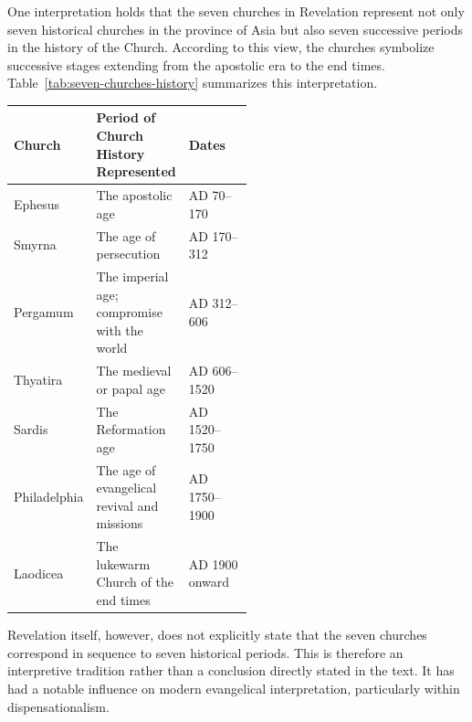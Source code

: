 \begin{InDepth}
One interpretation holds that the seven churches in Revelation represent not only seven historical churches in the province of Asia but also seven successive periods in the history of the Church. According to this view, the churches symbolize successive stages extending from the apostolic era to the end times. Table~\ref{tab:seven-churches-history} summarizes this interpretation.

\par\medskip\noindent
\begin{minipage}{\linewidth}
\centering\small
\renewcommand{\arraystretch}{1}\setlength{\tabcolsep}{4pt}
\label{tab:seven-churches-history}
\begin{tabularx}{\linewidth}{>{\raggedright\arraybackslash}p{0.25\linewidth}|
                              >{\raggedright\arraybackslash}X|
                              >{\raggedright\arraybackslash}p{0.27\linewidth}}
\hline
\textbf{Church} & \textbf{Period of Church History Represented} & \textbf{Dates} \\
\hline
Ephesus & The apostolic age & AD 70--170 \\
Smyrna & The age of persecution & AD 170--312 \\
Pergamum & The imperial age; compromise with the world & AD 312--606 \\
Thyatira & The medieval or papal age & AD 606--1520 \\
Sardis & The Reformation age & AD 1520--1750 \\
Philadelphia & The age of evangelical revival and missions & AD 1750--1900 \\
Laodicea & The lukewarm Church of the end times & AD 1900 onward \\
\hline
\end{tabularx}
\end{minipage}
\par\medskip

Revelation itself, however, does not explicitly state that the seven churches correspond in sequence to seven historical periods. This is therefore an interpretive tradition rather than a conclusion directly stated in the text. It has had a notable influence on modern evangelical interpretation, particularly within dispensationalism.\footnotemark\footnotemark\footnotemark
\end{InDepth}
\addtocounter{footnote}{-2}

